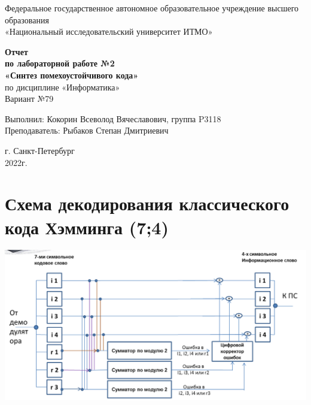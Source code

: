 \documentclass[12pt,onecolumn]{article}
\begin{document}
\begin{center}
    Федеральное государственное автономное образовательное учреждение высшего образования\\
	«Национальный исследовательский университет ИТМО»
\end{center}
\vspace{1cm}


\begin{center}
    \large \textbf{Отчет}\\
    \textbf{по лабораторной работе №2}\\
    \large \textbf{«Синтез помехоустойчивого кода»}\\
     по дисциплине «Информатика»\\
	\vspace{1cm}
    Вариант №79\\
\end{center}

\vspace{10cm}
\begin{flushright}
  Выполнил: Кокорин Всеволод Вячеславович, группа P3118\\
  Преподаватель: Рыбаков Степан Дмитриевич\\
\end{flushright}

\vspace{5cm}
\begin{center}
    г. Санкт-Петербург\\
    2022г.
\end{center}
\newpage
\tableofcontents
\newpage
\section{Схема декодирования классического кода Хэмминга (7;4)}
\includegraphics[width=15cm]{img/img1.png}
\newpage
\end{document}
